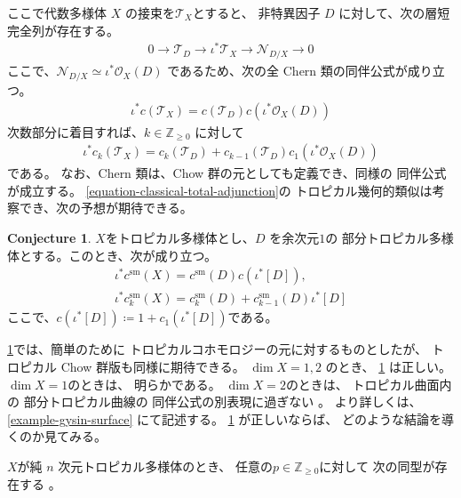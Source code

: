 \documentclass[a4paper,dvipdfmx,reqno,12pt]{amsart}
\theoremstyle{definition}
\newtheorem{conjecture}[theorem]{Conjecture}
\newcommand{\deq}{\coloneqq}
\numberwithin{equation}{section}
\begin{document}
ここで代数多様体 $X$ の接束を$\mathcal{T}_X$とすると、
非特異因子 $D$ に対して、次の層短完全列が存在する。
\begin{align}
0 \to \mathcal{T}_{D}\to \iota^{*}\mathcal{T}_X
\to \mathcal{N}_{D/X}\to 0
\end{align}
ここで、$\mathcal{N}_{D/X}\simeq \iota^{*}\mathcal{O}_X(D)$
であるため、次の全 Chern 類の同伴公式が成り立つ。
\begin{align}
\label{equation-classical-total-adjunction}
\iota^{*}c(\mathcal{T}_X)
=c(\mathcal{T}_{D})c(\iota^{*}\mathcal{O}_X(D))
\end{align}
次数部分に着目すれば、$k\in \mathbb{Z}_{\geq 0}$
に対して
\begin{align}
\label{equation-classical-total-adjunction}
\iota^{*}c_k(\mathcal{T}_X)
=c_{k}(\mathcal{T}_{D})+
c_{k-1}(\mathcal{T}_{D})c_1(\iota^{*}\mathcal{O}_X(D))
\end{align}
である。
なお、Chern 類は、Chow 群の元としても定義でき、同様の
同伴公式が成立する。
\eqref{equation-classical-total-adjunction}の
トロピカル幾何的類似は考察でき、次の予想が期待できる。
\begin{conjecture}
\label{conjecture-grr-divisor}
$X$をトロピカル多様体とし、$D$ を余次元$1$の
部分トロピカル多様体とする。このとき、次が成り立つ。
\begin{align}
\label{equation-total-adjunction}
\iota^{*}c^{\mathrm{sm}}(X)=c^{\mathrm{sm}}(D)c(\iota^{*}[D]), \\ 
\iota^{*}c^{\mathrm{sm}}_k(X)=c^{\mathrm{sm}}_k(D)+c^{\mathrm{sm}}_{k-1}(D)\iota^{*}[D]
\end{align}
ここで、$c(\iota^{*}[D])\deq 1+c_1(\iota^{*}[D])$である。 
\end{conjecture}
\cref{conjecture-grr-divisor}では、簡単のために
トロピカルコホモロジーの元に対するものとしたが、
トロピカル Chow 群版も同様に期待できる。
$\dim X=1,2$ のとき、
\cref{conjecture-grr-divisor}
は正しい。$\dim X=1$のときは、
明らかである。
$\dim X=2$のときは、
トロピカル曲面内の
部分トロピカル曲線の
同伴公式の別表現に過ぎない
\cite[Theorem 6]{shaw2015tropical}。
より詳しくは、\cref{example-gysin-surface}
にて記述する。
\cref{conjecture-grr-divisor} 
が正しいならば、
どのような結論を導くのか見てみる。

$X$が純 $n$ 次元トロピカル多様体のとき、
任意の$p\in\mathbb{Z}_{\geq 0}$に対して
次の同型が存在する
\cite[Theorem 6.2]{gross2019sheaftheoretic}。
\end{document}
